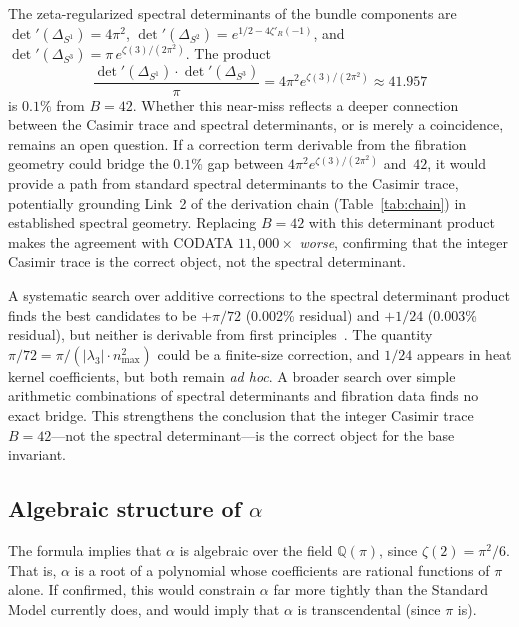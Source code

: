\documentclass[aps,prl,twocolumn,superscriptaddress]{revtex4-2}
\begin{document}
The zeta-regularized spectral determinants of the bundle components
are $\det'(\Delta_{S^1}) = 4\pi^2$,
$\det'(\Delta_{S^2}) = e^{1/2 - 4\zeta'_R(-1)}$, and
$\det'(\Delta_{S^3}) = \pi\, e^{\zeta(3)/(2\pi^2)}$. The product
\begin{equation}
  \frac{\det'(\Delta_{S^1}) \cdot \det'(\Delta_{S^3})}{\pi}
  = 4\pi^2 e^{\zeta(3)/(2\pi^2)} \approx 41.957
\end{equation}
is $0.1\%$ from $B = 42$. Whether this near-miss reflects a deeper
connection between the Casimir trace and spectral determinants, or is
merely a coincidence, remains an open question. If a correction term
derivable from the fibration geometry could bridge the $0.1\%$ gap
between $4\pi^2 e^{\zeta(3)/(2\pi^2)}$ and~$42$, it would provide a
path from standard spectral determinants to the Casimir trace,
potentially grounding Link~2 of the derivation chain
(Table~\ref{tab:chain}) in established spectral geometry. Replacing $B = 42$
with this determinant product makes the agreement with CODATA
$11{,}000\times$ \textit{worse}, confirming that the integer Casimir
trace is the correct object, not the spectral determinant.

A systematic search over additive corrections to the spectral
determinant product finds the best candidates to be $+\pi/72$ (0.002\%
residual) and $+1/24$ (0.003\% residual), but neither is derivable from
first principles~\cite{phase2_kappa}. The quantity $\pi/72 =
\pi/(|\lambda_3| \cdot n_{\max}^2)$ could be a finite-size correction,
and $1/24$ appears in heat kernel coefficients, but both remain
\textit{ad hoc}. A broader search over simple arithmetic combinations of
spectral determinants and fibration data finds no exact bridge. This
strengthens the conclusion that the integer Casimir trace $B = 42$---not
the spectral determinant---is the correct object for the base invariant.


\subsection{Algebraic structure of $\alpha$}

The formula implies that $\alpha$ is algebraic over the field
$\mathbb{Q}(\pi)$, since $\zeta(2) = \pi^2/6$. That is,
$\alpha$ is a root of a polynomial whose coefficients are rational
functions of $\pi$ alone. If confirmed, this would constrain $\alpha$
far more tightly than the Standard Model currently does, and would
imply that $\alpha$ is transcendental (since $\pi$ is).
\end{document}
